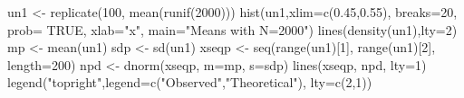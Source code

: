 \begin{Schunk}
\begin{Sinput}
  un1 <- replicate(100, mean(runif(2000)))
  hist(un1,xlim=c(0.45,0.55), breaks=20, prob= TRUE, xlab="x", main="Means with N=2000")
  lines(density(un1),lty=2)
  mp <- mean(un1)
  sdp <- sd(un1)
  xseqp <- seq(range(un1)[1], range(un1)[2], length=200)
  npd <- dnorm(xseqp, m=mp, s=sdp)
  lines(xseqp, npd, lty=1)
  legend("topright",legend=c("Observed","Theoretical"), lty=c(2,1))
\end{Sinput}
\end{Schunk}
